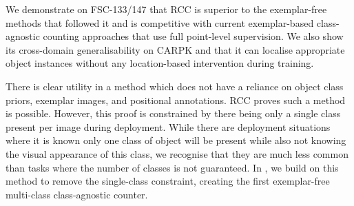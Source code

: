 \documentclass[../thesis.tex]{subfiles}
\begin{document}
We demonstrate on FSC-133/147 that RCC is superior to the exemplar-free methods that followed it and is competitive with current exemplar-based class-agnostic counting approaches that use full point-level supervision. We also show its cross-domain generalisability on CARPK and that it can localise appropriate object instances without any location-based intervention during training.

There is clear utility in a method which does not have a reliance on object class priors, exemplar images, and positional annotations. RCC proves such a method is possible.
However, this proof is constrained by there being only a single class present per image during deployment.
While there are deployment situations where it is known only one class of object will be present while also not knowing the visual appearance of this class, we recognise that they are much less common than tasks where the number of classes is not guaranteed.
In  , we build on this method to remove the single-class constraint, creating the first exemplar-free multi-class class-agnostic counter.
\end{document}
